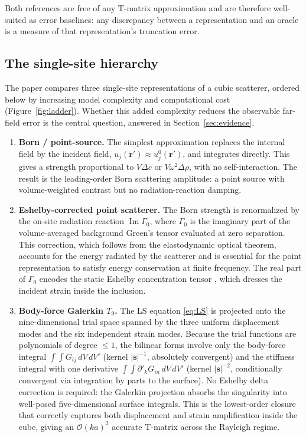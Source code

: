 \documentclass[11pt,a4paper]{article}
\newcommand{\D}{\Delta}
\newcommand{\order}{\mathcal{O}}
\newcommand{\bs}{\bm{s}}
\newcommand{\br}{\bm{r}}
\theoremstyle{plain}
\theoremstyle{definition}
\theoremstyle{remark}
\begin{document}
Both references are free of any T-matrix approximation and are therefore
well-suited as error baselines: any discrepancy between a representation
and an oracle is a measure of that representation's truncation error.

\subsection{The single-site hierarchy}
\label{sec:hierarchy}

The paper compares three single-site representations of a cubic scatterer,
ordered below by increasing model complexity and computational cost
(Figure~\ref{fig:ladder}).  Whether this added complexity reduces the
observable far-field error is the central question, answered in
Section~\ref{sec:evidence}.

\begin{enumerate}[leftmargin=2em,label=\arabic*.]
  \item \textbf{Born / point-source.}  The simplest approximation
    replaces the internal field by the incident field,
    $u_j(\br') \approx u_j^0(\br')$, and integrates directly.  This
    gives a strength proportional to $V\D c$ or $V\omega^2\D\rho$,
    with no self-interaction.  The result is the leading-order Born
    scattering amplitude: a point source with volume-weighted contrast
    but no radiation-reaction damping.

  \item \textbf{Eshelby-corrected point scatterer.}  The Born strength
    is renormalized by the on-site radiation reaction $\operatorname{Im}\Gamma_0$,
    where $\Gamma_0$ is the imaginary part of the volume-averaged
    background Green's tensor evaluated at zero separation.  This
    correction, which follows from the elastodynamic optical theorem,
    accounts for the energy radiated by the scatterer and is essential
    for the point representation to satisfy energy conservation at
    finite frequency.  The real part of $\Gamma_0$ encodes the static
    Eshelby concentration tensor \cite{eshelby1957}, which dresses the
    incident strain inside the inclusion.

  \item \textbf{Body-force Galerkin $T_9$.}  The LS equation
    \eqref{eq:LS} is projected onto the nine-dimensional trial space
    spanned by the three uniform displacement modes and the six
    independent strain modes.  Because the trial functions are
    polynomials of degree $\le 1$, the bilinear forms involve only the
    body-force integral $\int\!\!\int G_{ij}\,dV\,dV'$ (kernel
    $|\bs|^{-1}$, absolutely convergent) and the stiffness integral
    with one derivative $\int\!\!\int \partial'_k G_{in}\,dV\,dV'$
    (kernel $|\bs|^{-2}$, conditionally convergent via integration by
    parts to the surface).  No Eshelby delta correction is required:
    the Galerkin projection absorbs the singularity into well-posed
    five-dimensional surface integrals.  This is the lowest-order
    closure that correctly captures both displacement and strain
    amplification inside the cube, giving an $\order(ka)^2$ accurate
    T-matrix across the Rayleigh regime.
\end{enumerate}
\end{document}
